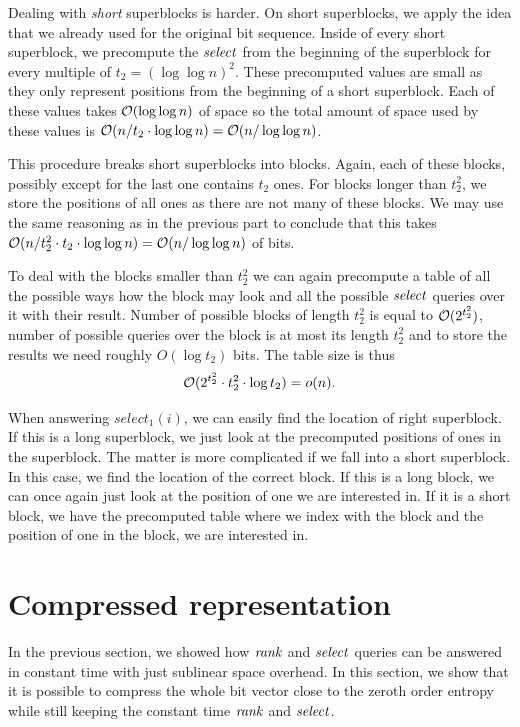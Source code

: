 Dealing with \textit{short} superblocks is harder. On short superblocks, we apply the idea that we
already used for the original bit sequence. Inside of every short superblock, we precompute the
$\mathit{select}$ from the beginning of the superblock for every multiple of $t_2=(\log\log n)^2$. These
precomputed values are small as they only represent positions from the beginning of a short superblock.
Each of these values takes $\mathcal{O}(\log\log n)$ of space so the total amount of space used by these
values is $\mathcal{O}(n/t_2\cdot \log\log n) = \mathcal{O}(n/\log\log n)$.

This procedure breaks short superblocks into blocks. Again, each of these blocks, possibly except for the
last one contains $t_2$ ones. For blocks longer than $t_2^2$, we store the positions of all
ones as there are not many of these blocks. We may use the same reasoning as in the previous
part to conclude that this takes $\mathcal{O}(n/t_2^2\cdot t_2\cdot \log\log n) = \mathcal{O}(n/\log\log n)$
of bits.

To deal with the blocks smaller than $t_2^2$ we can again precompute a table of all
the possible ways how the block may look and all the possible $\mathit{select}$ queries over it with
their result. Number of possible blocks of length $t_2^2$ is equal to $\mathcal{O}(2^{t_2^2})$,
number of possible queries over the block is at most its length $t_2^2$ and to store the results
we need roughly $O(\log t_2)$ bits. The table size is thus
$$\mathcal{O}(2^{t_2^2}\cdot t_2^2 \cdot \log t_2) = o(n).$$

When answering $select_1(i)$, we can easily find the location of right superblock. If this
is a long superblock, we just look at the precomputed positions of ones in the superblock.
The matter is more complicated if we fall into a short superblock. In this case, we find
the location of the correct block. If this is a long block, we can once again just look
at the position of one we are interested in. If it is a short block, we have the precomputed
table where we index with the block and the position of one in the block, we are interested in.

\section{Compressed representation}
\label{section:compressed_bv}

In the previous section, we showed how $\mathit{rank}$ and $\mathit{select}$ queries can be answered in constant
time with just sublinear space overhead. In this section, we show that it is possible to compress
the whole bit vector close to the zeroth order entropy while still keeping the constant time $\mathit{rank}$
and $\mathit{select}$.


